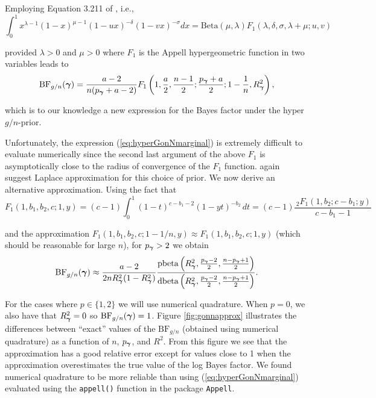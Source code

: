 \noindent  Employing Equation 3.211 of \cite{Gradshteyn2007}, i.e.,
$$
\int_0^1 x^{\lambda-1}(1 - x)^{\mu - 1}(1 - u x)^{-\delta}(1 - vx)^{-\sigma} dx = \mbox{Beta}(\mu,\lambda) F_1(\lambda,\delta,\sigma,\lambda+\mu;u,v) 
$$

\noindent provided $\lambda>0$ and $\mu>0$ where $F_1$ is the Appell
hypergeometric function in two variables \citep{Weisstein2009} leads to
\begin{equation}\label{eq:hyperGonNmarginal}
	\displaystyle \mbox{BF}_{g/n}({\boldsymbol \gamma}) =  \frac{a - 2}{n(p_{\boldsymbol \gamma} + a - 2)} F_1\left( 1, \frac{a}{2}, \frac{n-1}{2}; \frac{p_{\boldsymbol \gamma} + a}{2}; 1  -  \frac{1}{n}, R_{\boldsymbol \gamma}^2 \right),
\end{equation}

\noindent which is to our knowledge a new expression for the Bayes factor under
the hyper $g/n$-prior.


Unfortunately, the expression (\ref{eq:hyperGonNmarginal}) is extremely
difficult to evaluate numerically since the second last argument of the above
$F_1$ is asymptotically close to the radius of convergence of the $F_1$
function.  \cite{Liang2008} again suggest Laplace approximation for this choice
of prior. We now derive an alternative approximation.  Using the fact that
$$
F_1(1,b_1,b_2,c; 1,y) 
= (c - 1)
\int_0^1  (1-t)^{c-b_1-2} (1-yt)^{-b_2} \, dt
= (c - 1) \frac{\, _2F_1(1,b_2;c-b_1;y)}{c-b_1-1}
$$

\noindent and the approximation $F_1(1,b_1,b_2,c; 1-1/n,y)  \approx
F_1(1,b_1,b_2,c; 1,y)$ (which should be reasonable for large $n$), for
$p_{\boldsymbol \gamma} > 2$ we obtain
\begin{equation}\label{eq:hyperGonNmarginalApprox}
	\displaystyle \mbox{BF}_{g/n}({\boldsymbol \gamma}) 
	\approx    
	\frac{a - 2}{2n R_{\boldsymbol \gamma}^2(1 - R_{\boldsymbol \gamma}^2)}   \frac{
		\mbox{pbeta}\left( R_{\boldsymbol \gamma}^2, \frac{p_{\boldsymbol \gamma}-2}{2}, \frac{n-p_{\boldsymbol \gamma}+1}{2} \right)
	}{
		\mbox{dbeta}\left( R_{\boldsymbol \gamma}^2, \frac{p_{\boldsymbol \gamma}-2}{2}, \frac{n-p_{\boldsymbol \gamma}+1}{2} \right)
	}.
\end{equation}

\noindent For the cases where $p\in \{1,2\}$ we will use numerical quadrature.
When $p=0$, we also have that $R_{\boldsymbol \gamma}^2= 0$ so $\mbox{BF}_{g/n}({\boldsymbol \gamma}) =
1$.  Figure \ref{fig:gonnapprox} illustrates the differences between ``exact''
values of the $\mbox{BF}_{g/n}$ (obtained using numerical quadrature) as a
function of $n$, $p_{\boldsymbol \gamma}$, and $R^2$. From this figure we see that the
approximation has a good relative error except for values close to 1 when the
approximation overestimates the true value of the log Bayes factor. We found
numerical quadrature to be more reliable than using
(\ref{eq:hyperGonNmarginal}) evaluated using the {\tt appell()} function in the
package {\tt Appell}.

